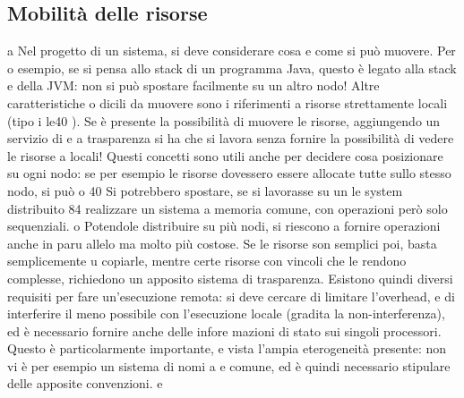 \documentclass[a4paper,12pt]{article}
\begin{document}
\subsection{Mobilità delle risorse}
a
Nel progetto di un sistema, si deve considerare cosa e come si può muovere. Per
o
esempio, se si pensa allo stack di un programma Java, questo è legato alla stack
e
della JVM: non si può spostare facilmente su un altro nodo! Altre caratteristiche
o
dicili da muovere sono i riferimenti a risorse strettamente locali (tipo i le40 ).
Se è presente la possibilità di muovere le risorse, aggiungendo un servizio di
e
a
trasparenza si ha che si lavora senza fornire la possibilità di vedere le risorse
a
locali!
Questi concetti sono utili anche per decidere cosa posizionare su ogni nodo:
se per esempio le risorse dovessero essere allocate tutte sullo stesso nodo, si può
o
40 Si
potrebbero spostare, se si lavorasse su un le system distribuito
84
realizzare un sistema a memoria comune, con operazioni però solo sequenziali.
o
Potendole distribuire su più nodi, si riescono a fornire operazioni anche in paru
allelo ma molto più costose. Se le risorse son semplici poi, basta semplicemente
u
copiarle, mentre certe risorse con vincoli che le rendono complesse, richiedono
un apposito sistema di trasparenza.
Esistono quindi diversi requisiti per fare un'esecuzione remota: si deve cercare di limitare l'overhead, e di
interferire il meno possibile con l'esecuzione
locale (gradita la non-interferenza), ed è necessario fornire anche delle infore
mazioni di stato sui singoli processori. Questo è particolarmente importante,
e
vista l'ampia eterogeneità presente: non vi è per esempio un sistema di nomi
a
e
comune, ed è quindi necessario stipulare delle apposite convenzioni.
e
\end{document}
